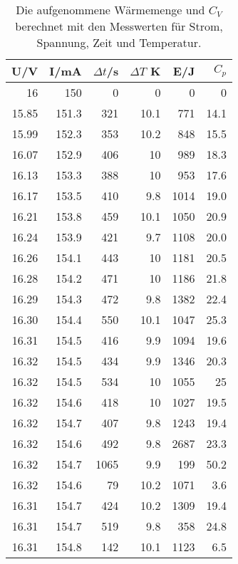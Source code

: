 \begin{table}[ht]
    \centering
    \caption{Die aufgenommene Wärmemenge und $C_V$ berechnet mit den Messwerten für Strom, Spannung, Zeit und Temperatur.}
    \begin{tabular}{rrrrrr}
    \toprule
    U/V & I/mA & $\Delta t$/s & $\Delta T$ K & E/J & $C_p$  \\ 
    \midrule
    16   & 150  & 0   & 0   & 0   & 0    \\
    15.85& 151.3& 321 & 10.1& 771 & 14.1 \\
    15.99& 152.3& 353 & 10.2& 848 & 15.5 \\
    16.07& 152.9& 406 & 10  & 989 & 18.3 \\
    16.13& 153.3& 388 & 10  & 953 & 17.6 \\
    16.17& 153.5& 410 & 9.8 & 1014& 19.0 \\
    16.21& 153.8& 459 & 10.1& 1050& 20.9 \\ 
    16.24& 153.9& 421 & 9.7 & 1108& 20.0 \\
    16.26& 154.1& 443 & 10  & 1181& 20.5 \\
    16.28& 154.2& 471 & 10  & 1186& 21.8 \\
    16.29& 154.3& 472 & 9.8 & 1382& 22.4 \\
    16.30& 154.4& 550 & 10.1& 1047& 25.3 \\
    16.31& 154.5& 416 & 9.9 & 1094& 19.6 \\
    16.32& 154.5& 434 & 9.9 & 1346& 20.3 \\
    16.32& 154.5& 534 & 10  & 1055& 25   \\
    16.32& 154.6& 418 & 10  & 1027& 19.5 \\
    16.32& 154.7& 407 & 9.8 & 1243& 19.4 \\
    16.32& 154.6& 492 & 9.8 & 2687& 23.3 \\
    16.32& 154.7& 1065& 9.9 & 199 & 50.2 \\
    16.32& 154.6& 79  & 10.2& 1071& 3.6  \\
    16.31& 154.7& 424 & 10.2& 1309& 19.4 \\
    16.31& 154.7& 519 & 9.8 & 358 & 24.8 \\
    16.31& 154.8& 142 & 10.1& 1123& 6.5  \\
    \bottomrule
    \end{tabular}
    \label{tab:Messwerte}
\end{table}